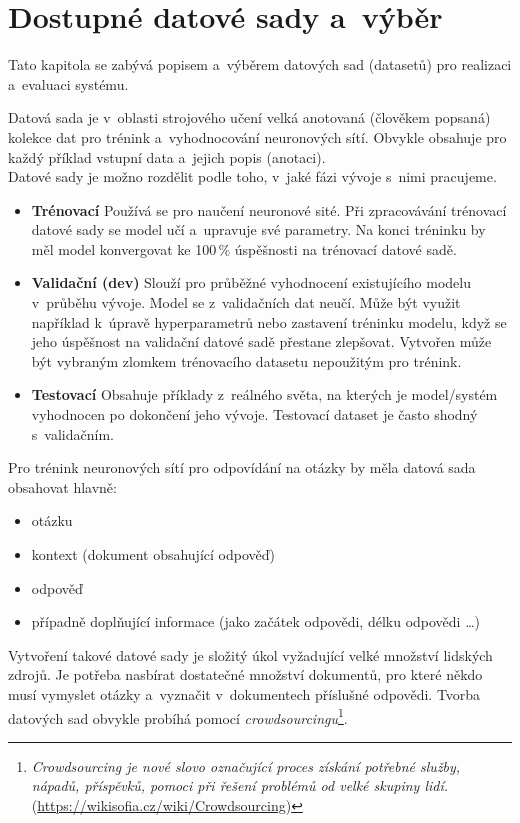 \chapter{Dostupné datové sady a~výběr}
\label{available_datasets}
Tato kapitola se zabývá popisem a~výběrem datových sad (datasetů) pro realizaci a~evaluaci systému.\par
Datová sada je v~oblasti strojového učení velká anotovaná (člověkem popsaná) kolekce dat pro trénink a~vyhodnocování neuronových sítí. Obvykle obsahuje pro každý příklad vstupní data a~jejich popis (anotaci).\\
Datové sady je možno rozdělit podle toho, v~jaké fázi vývoje s~nimi pracujeme.
\begin{itemize}
    \item \textbf{Trénovací} Používá se pro naučení neuronové sité. Při zpracovávání trénovací datové sady se model učí a~upravuje své parametry. Na konci tréninku by měl model konvergovat ke 100\,\% úspěšnosti na trénovací datové sadě.
    \item \textbf{Validační (dev)} Slouží pro průběžné vyhodnocení existujícího modelu v~průběhu vývoje. Model se z~validačních dat neučí. Může být využit například k~úpravě hyperparametrů nebo zastavení tréninku modelu, když se jeho úspěšnost na validační datové sadě přestane zlepšovat. Vytvořen může být vybraným zlomkem trénovacího datasetu nepoužitým pro trénink.
    \item \textbf{Testovací} Obsahuje příklady z~reálného světa, na kterých je model/systém vyhodnocen po dokončení jeho vývoje. Testovací dataset je často shodný s~validačním.
\end{itemize}
Pro trénink neuronových sítí pro odpovídání na otázky by měla datová sada obsahovat hlavně:
\begin{itemize}
    \item otázku
    \item kontext (dokument obsahující odpověď)
    \item odpověď
    \item případně doplňující informace (jako začátek odpovědi, délku odpovědi \dots)
\end{itemize}
Vytvoření takové datové sady je složitý úkol vyžadující velké množství lidských zdrojů. Je potřeba nasbírat dostatečné množství dokumentů, pro které někdo musí vymyslet otázky a~vyznačit v~dokumentech příslušné odpovědi. Tvorba datových sad obvykle probíhá pomocí \emph{crowdsourcingu}\footnote{\emph{Crowdsourcing je nové slovo označující proces získání potřebné služby, nápadů, příspěvků, pomoci při řešení problémů od velké skupiny lidí.} (\url{https://wikisofia.cz/wiki/Crowdsourcing})}.

